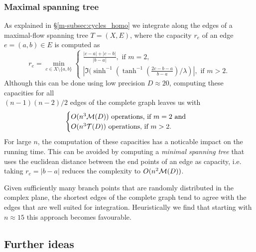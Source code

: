\documentclass[main.tex]{subfiles}
\begin{document}
   \subsubsection{Maximal spanning tree}
    As explained in \S \ref{m-subsec:cycles_homo} we integrate along the edges of a maximal-flow spanning tree $T = (X,E)$, where the capacity $r_e$ of an edge $e = (a,b) \in E$ is computed as
    \begin{equation}
     r_e =  \min_{c \in X \setminus \{ a,b\}} \begin{cases}
            \frac{|c-a|+|c-b|}{|b-a|}, \text{ if $m=2$,}\\
            | \Im(\sinh^{-1}(\tanh^{-1}(\frac{2c - b -a}{b-a})/\lambda) |, \text{ if $m>2$.}
            \end{cases}
    \end{equation}
    Although this can be done using low precision $D \approx 20$, computing these capacities for all \\ $(n-1)(n-2)/2$ edges of the complete graph leaves us with
    \begin{equation}
     \begin{cases}
     O(n^3 \mathcal M(D)) \text{ operations, if $m=2$ and}\\
     O(n^3 \mathcal T(D)) \text{ operations, if $m>2$}.
    \end{cases}
    \end{equation}
    For large $n$, the computation of these capacities has a noticable impact on the running time. This can be avoided by computing a \emph{minimal spanning tree} that uses the euclidean distance
    between the end points of an edge as capacity, i.e. taking $r_e = |b-a|$ reduces the complexity to $O(n^2 \mathcal M(D))$.
    
    Given sufficiently many branch points that are randomly distributed in the complex plane, the shortest edges of the complete graph tend to agree with the edges that are well suited for integration.
    Heuristically we find that starting with $n \approx 15$ this approach becomes favourable.
    
    



    
    
   
   
  \subsection{Further ideas} 
    \todo
    
\biblio
\end{document}
